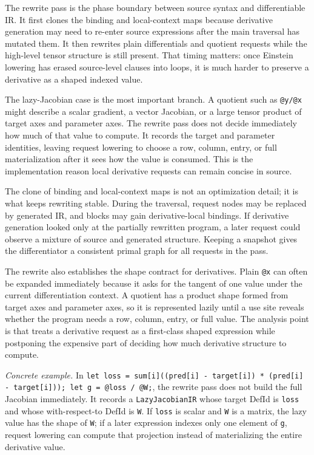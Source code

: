 The rewrite pass is the phase boundary between source syntax and differentiable
IR. It first clones the binding and local-context maps because derivative
generation may need to re-enter source expressions after the main traversal has
mutated them. It then rewrites plain differentials and quotient requests while
the high-level tensor structure is still present. That timing matters: once
Einstein lowering has erased source-level clauses into loops, it is much harder
to preserve a derivative as a shaped indexed value.

The lazy-Jacobian case is the most important branch. A quotient such as
\texttt{@y/@x} might describe a scalar gradient, a vector Jacobian, or a large
tensor product of target axes and parameter axes. The rewrite pass does not
decide immediately how much of that value to compute. It records the target and
parameter identities, leaving request lowering to choose a row, column, entry,
or full materialization after it sees how the value is consumed. This is the
implementation reason local derivative requests can remain concise in source.

The clone of binding and local-context maps is not an optimization detail; it is
what keeps rewriting stable. During the traversal, request nodes may be replaced
by generated IR, and blocks may gain derivative-local bindings. If derivative
generation looked only at the partially rewritten program, a later request could
observe a mixture of source and generated structure. Keeping a snapshot gives
the differentiator a consistent primal graph for all requests in the pass.

The rewrite also establishes the shape contract for derivatives. Plain
\texttt{@x} can often be expanded immediately because it asks for the tangent of
one value under the current differentiation context. A quotient has a product
shape formed from target axes and parameter axes, so it is represented lazily
until a use site reveals whether the program needs a row, column, entry, or
full value. The analysis point is that \einlang{} treats a derivative request as
a first-class shaped expression while postponing the expensive part of deciding
how much derivative structure to compute.

\textit{Concrete example.} In \texttt{let loss = sum[i]((pred[i] -
target[i]) * (pred[i] - target[i])); let g = @loss / @W;}, the rewrite pass
does not build the full Jacobian immediately. It records a
\texttt{LazyJacobianIR} whose target DefId is \texttt{loss} and whose
with-respect-to DefId is \texttt{W}. If \texttt{loss} is scalar and \texttt{W}
is a matrix, the lazy value has the shape of \texttt{W}; if a later expression
indexes only one element of \texttt{g}, request lowering can compute that
projection instead of materializing the entire derivative value.

